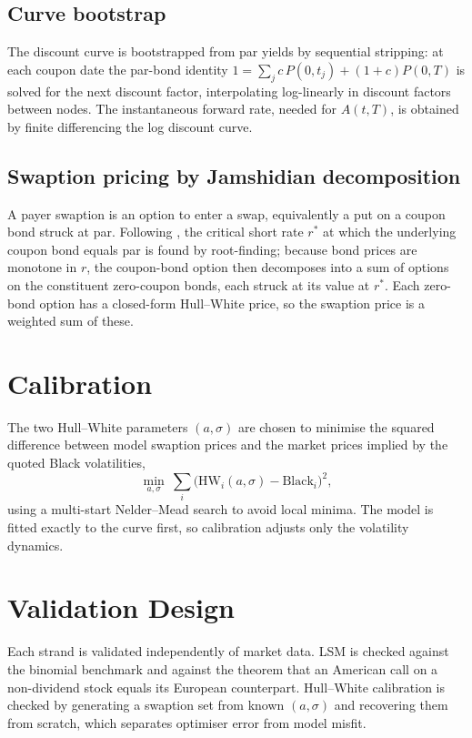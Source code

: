 \documentclass[11pt,a4paper]{report}
\begin{document}
\subsection{Curve bootstrap}
The discount curve is bootstrapped from par yields by sequential stripping: at each
coupon date the par-bond identity $1 = \sum_j c\,P(0,t_j) + (1+c)P(0,T)$ is solved
for the next discount factor, interpolating log-linearly in discount factors between
nodes. The instantaneous forward rate, needed for $A(t,T)$, is obtained by finite
differencing the log discount curve.

\subsection{Swaption pricing by Jamshidian decomposition}
A payer swaption is an option to enter a swap, equivalently a put on a coupon bond
struck at par. Following \citet{jamshidian1989}, the critical short rate $r^\ast$ at
which the underlying coupon bond equals par is found by root-finding; because bond
prices are monotone in $r$, the coupon-bond option then decomposes into a sum of
options on the constituent zero-coupon bonds, each struck at its value at $r^\ast$.
Each zero-bond option has a closed-form Hull--White price, so the swaption price is a
weighted sum of these.

\section{Calibration}
The two Hull--White parameters $(a,\sigma)$ are chosen to minimise the squared
difference between model swaption prices and the market prices implied by the quoted
Black volatilities,
\begin{equation}
\min_{a,\sigma} \ \sum_i \big(\text{HW}_i(a,\sigma) - \text{Black}_i\big)^2,
\end{equation}
using a multi-start Nelder--Mead search to avoid local minima. The model is fitted
exactly to the curve first, so calibration adjusts only the volatility dynamics.

\section{Validation Design}
Each strand is validated independently of market data. LSM is checked against the
binomial benchmark and against the theorem that an American call on a non-dividend
stock equals its European counterpart. Hull--White calibration is checked by
generating a swaption set from known $(a,\sigma)$ and recovering them from scratch,
which separates optimiser error from model misfit.
\end{document}
